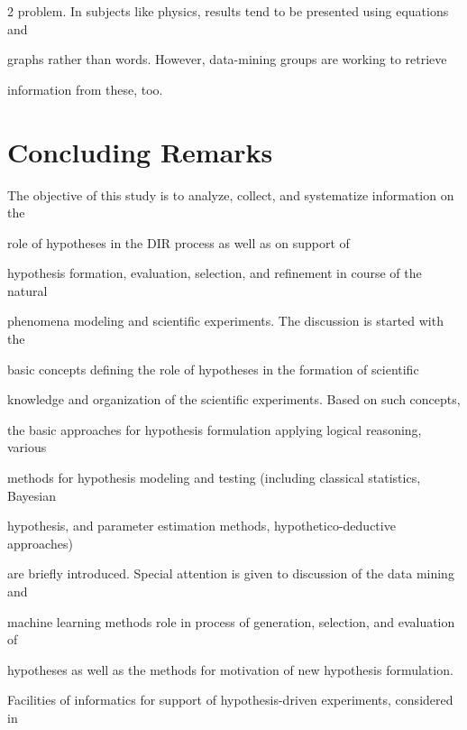 \begin{multicols}{2}
problem. In subjects like physics, results tend to be presented using equations and


graphs rather than words. However, data-mining groups are working to retrieve


information from these, too.





\vspace*{-6pt}





\section{Concluding Remarks}











\noindent


  The objective of this study is to analyze, collect, and systematize information on the


role of hypotheses in the DIR process as well as on support of


hypothesis formation, evaluation, selection, and refinement in course of the natural


phenomena modeling and scientific experiments. The discussion is started with the


basic concepts defining the role of hypotheses in the formation of scientific


knowledge and organization of the scientific experiments. Based on such concepts,


the basic approaches for hypothesis formulation applying logical reasoning, various


methods for hypothesis modeling and testing (including classical statistics, Bayesian


hypothesis, and parameter estimation methods, hypothetico-deductive approaches)


are briefly introduced. Special attention is given to discussion of the data mining and


machine learning methods role in process of generation, selection, and evaluation of


hypotheses as well as the methods for motivation of new hypothesis formulation.


Facilities of informatics for support of hypothesis-driven experiments, considered in



\end{multicols}
